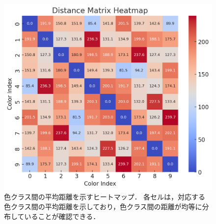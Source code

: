 \begin{figure}[H]
    \centering
    \includegraphics[width=\columnwidth]{tables/Distance_Matrix_Heatmap_color.png}
    \caption[色クラス間の平均距離を示すヒートマップ．]{
        色クラス間の平均距離を示すヒートマップ．
        各セルは，対応する色クラス間の平均距離を示しており，色クラス間の距離が均等に分布していることが確認できる．
    }
    \label{fig:color_class_distance}
\end{figure}


